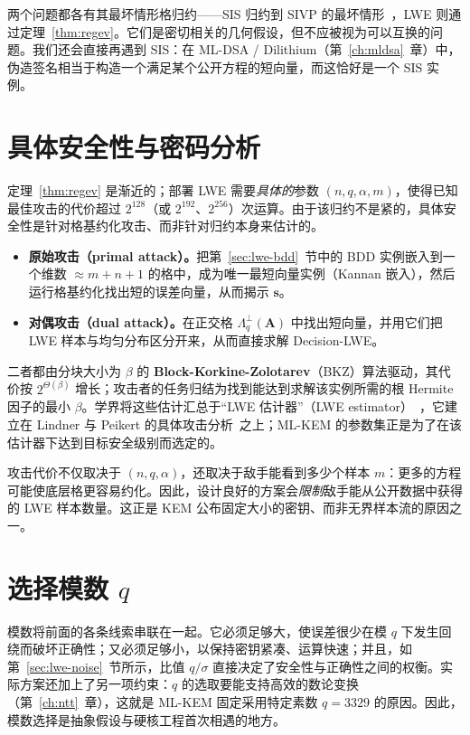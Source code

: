 两个问题都各有其最坏情形格归约——SIS 归约到 SIVP 的最坏情形~\cite{ajtai1996}，LWE 则通过定理~\ref{thm:regev}。它们是密切相关的几何假设，但不应被视为可以互换的问题。我们还会直接再遇到 SIS：在 ML-DSA / Dilithium（第~\ref{ch:mldsa}~章）中，伪造签名相当于构造一个满足某个公开方程的短向量，而这恰好是一个 SIS 实例。

\section{具体安全性与密码分析}
\label{sec:lwe-cryptanalysis}

定理~\ref{thm:regev} 是渐近的；部署 LWE 需要\emph{具体的}参数 $(n,q,\alpha,m)$，使得已知最佳攻击的代价超过 $2^{128}$（或 $2^{192}$、$2^{256}$）次运算。由于该归约不是紧的，具体安全性是针对格基约化攻击、而非针对归约本身来估计的。

\begin{itemize}
  \item \textbf{原始攻击（primal attack）。}把第~\ref{sec:lwe-bdd}~节中的 BDD 实例嵌入到一个维数 $\approx m+n+1$ 的格中，成为唯一最短向量实例（Kannan 嵌入），然后运行格基约化找出短的误差向量，从而揭示 $\mathbf{s}$。
  \item \textbf{对偶攻击（dual attack）。}在正交格 $\Lambda_q^{\perp}(\mathbf{A})$ 中找出短向量，并用它们把 LWE 样本与均匀分布区分开来，从而直接求解 Decision-LWE。
\end{itemize}

二者都由分块大小为 $\beta$ 的 \textbf{Block-Korkine-Zolotarev}（BKZ）算法驱动，其代价按 $2^{\Theta(\beta)}$ 增长；攻击者的任务归结为找到能达到求解该实例所需的根 Hermite 因子的最小 $\beta$。学界将这些估计汇总于“LWE 估计器”（LWE estimator）~\cite{aps2015}，它建立在 Lindner 与 Peikert 的具体攻击分析~\cite{lindnerpeikert2011}之上；ML-KEM 的参数集正是为了在该估计器下达到目标安全级别而选定的。

\begin{remark}[样本数量是假设的一部分]
攻击代价不仅取决于 $(n,q,\alpha)$，还取决于敌手能看到多少个样本 $m$：更多的方程可能使底层格更容易约化。因此，设计良好的方案会\emph{限制}敌手能从公开数据中获得的 LWE 样本数量。这正是 KEM 公布固定大小的密钥、而非无界样本流的原因之一。
\end{remark}

\section{选择模数 $q$}

模数将前面的各条线索串联在一起。它必须足够大，使误差很少在模 $q$ 下发生回绕而破坏正确性；又必须足够小，以保持密钥紧凑、运算快速；并且，如第~\ref{sec:lwe-noise}~节所示，比值 $q/\sigma$ 直接决定了安全性与正确性之间的权衡。实际方案还加上了另一项约束：$q$ 的选取要能支持高效的数论变换（第~\ref{ch:ntt}~章），这就是 ML-KEM 固定采用特定素数 $q=3329$ 的原因。因此，模数选择是抽象假设与硬核工程首次相遇的地方。


